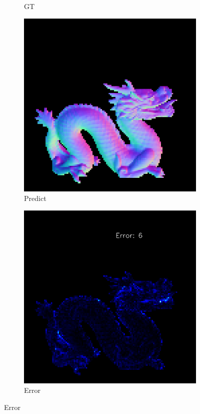 \begin{figure}[H]
\begin{subfigure}[b]{0.24\linewidth}
		\caption{GT}
	\end{subfigure}
	\begin{subfigure}[b]{0.24\linewidth}
		\includegraphics[width=\linewidth]{./Figures/gcnn_synthetic/fancy_eval_7_normal_an2-8-1000.png}
		\caption{Predict}
	\end{subfigure}
	\begin{subfigure}[b]{0.24\linewidth}
		\includegraphics[width=\linewidth]{./Figures/gcnn_synthetic/fancy_eval_7_error_an2-8-1000.png}
		\caption{Error}
	\end{subfigure}
	

\end{figure}
